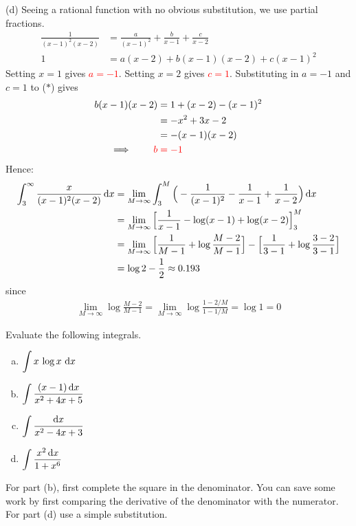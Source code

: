 \begin{solution}
\noindent (d)
Seeing a rational function with no obvious substitution, we use partial fractions.
\begin{align*}
\frac{1}{(x-1)^2(x-2)}
&=\frac{a}{(x-1)^2}+\frac{b}{x-1}+\frac{c}{x-2}\\
1&=a(x-2)+b(x-1)(x-2)+c(x-1)^2\tag{$*$}
\end{align*}
Setting $x=1$ gives \textcolor{red}{$a=-1$}. Setting $x=2$ gives \textcolor{red}{$c=1$}. Substituting in $a=-1$
and $c=1$ to ($*$) gives
\begin{align*}
b(x-1)(x-2)&=1+(x-2)-(x-1)^2\\
&=-x^2+3x-2\\
&=-(x-1)(x-2)\\
\implies\qquad \color{red}b&\color{red}=-1
\end{align*}
Hence:
\begin{align*}
\int_3^\infty\frac{x}{(x-1)^2(x-2)}\,\mathrm{d}x
&=\lim_{M\rightarrow\infty}
\int_3^M\Big(-\frac{1}{(x-1)^2}-\frac{1}{x-1}+\frac{1}{x-2}\Big)\,\mathrm{d}x \\
&=\lim_{M\rightarrow\infty}
\Big[\frac{1}{x-1}-\log(x-1)+\log(x-2)\Big]_3^M\\
&=\lim_{M\rightarrow\infty}
\Big[\frac{1}{M-1}+\log\frac{M-2}{M-1}\Big]
-\Big[\frac{1}{3-1}+\log\frac{3-2}{3-1}\Big] \\
&=\log 2-\frac{1}{2}\approx0.193
\end{align*}
since
\begin{align*}
\lim_{M\rightarrow\infty}\log\frac{M-2}{M-1}
=\lim_{M\rightarrow\infty}\log\frac{1-2/M}{1-1/M}
=\log 1=0
\end{align*}

\end{solution}

\begin{question}[2002A]
Evaluate the following integrals.
\begin{enumerate}[(a)]
\item
$\displaystyle\int x\,\log x\ \dee{x}$
\item
 $\displaystyle\int\frac{(x-1)\,\mathrm{d}x}{x^2+4x+5}$
\item
$\displaystyle\int\frac{\mathrm{d}x}{x^2-4x+3}$
\item
$\displaystyle\int\frac{x^2\,\mathrm{d}x}{1+x^6}$
\end{enumerate}
\end{question}

\begin{hint}
For part (b), first complete the square in the denominator.
You can save some work by first comparing the derivative of the denominator
            with the numerator.
For part (d) use a simple substitution.
\end{hint}

